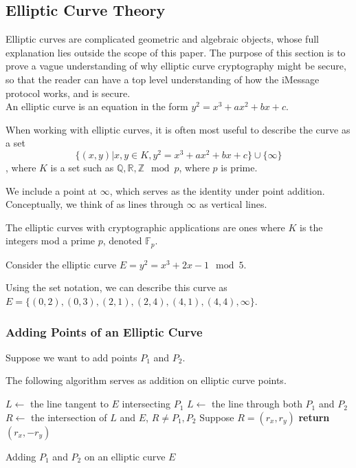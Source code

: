 \subsection{Elliptic Curve Theory}

Elliptic curves are complicated geometric and algebraic objects,
whose full explanation lies outside the scope of this paper.
The purpose of this section is to prove a vague understanding
of why elliptic curve cryptography might be secure, so that the reader
can have a top level understanding of how the iMessage protocol
works, and is secure.\\

An elliptic curve is an equation in the form $y^2 = x^3 + ax^2 + bx + c$.

When working with elliptic curves, it is often most useful to describe the curve as a set
$$\{(x,y) \vert x,y \in K, y^2 = x^3 + ax^2 + bx + c\} \cup \{ \infty \}$$, where $K$ is a set such as
$\mathbb{Q}, \mathbb{R}, \mathbb{Z} \mod p$, where $p$ is prime.

We include a point at
$\infty$, which serves as the identity under point addition.
Conceptually, we think of as lines through $\infty$
as vertical lines.

The elliptic curves with cryptographic applications are ones where $K$ is the integers
mod a prime $p$, denoted $\mathbb{F}_p$.

\begin{example}
Consider the elliptic curve $E = y^2 = x^3+2x-1 \mod 5$.

Using the set notation, we can describe this curve as
$E = \{(0 ,2 ),(0,3),(2,1),(2 ,4 ),(4,1),(4,4), \infty\}$.
\end{example}




\subsubsection{Adding Points of an Elliptic Curve}
Suppose we want to add points $P_1$ and $P_2$.

The following algorithm serves as addition on elliptic curve points.
\begin{algorithm}
    \begin{algorithmic}
         \State $L \gets$ the line tangent to $E$ intersecting $P_1$
         \Else
         \State $L \gets$ the line through both $P_1$ and $P_2$
         \EndIf
         \State $R \gets$ the intersection of $L$ and $E$, $R \neq P_1, P_2$
         \State Suppose $R = (r_x, r_y)$
         \State \textbf{return} $(r_x, -r_y)$
         \EndProcedure
     \end{algorithmic}
     \caption{Adding $P_1$ and $P_2$ on an elliptic curve $E$}
     \label{euclid}
 \end{algorithm}

